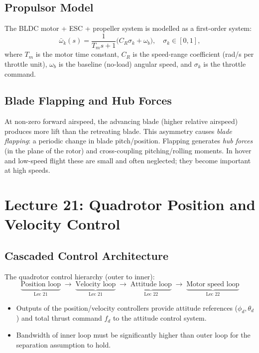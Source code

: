 \documentclass[11pt,a4paper]{article}
\begin{document}
\subsection{Propulsor Model}

The BLDC motor + ESC + propeller system is modelled as a first-order system:
\[
\bar\omega_k(s) = \frac{1}{T_m s+1}\bigl(C_R\sigma_k + \omega_b\bigr),\quad \sigma_k\in[0,1],
\]
where $T_m$ is the motor time constant, $C_R$ is the speed-range coefficient (rad/s per throttle unit), $\omega_b$ is the baseline (no-load) angular speed, and $\sigma_k$ is the throttle command.

\subsection{Blade Flapping and Hub Forces}

At non-zero forward airspeed, the advancing blade (higher relative airspeed) produces more lift than the retreating blade.
This asymmetry causes \emph{blade flapping}: a periodic change in blade pitch/position.
Flapping generates \emph{hub forces} (in the plane of the rotor) and cross-coupling pitching/rolling moments.
In hover and low-speed flight these are small and often neglected; they become important at high speeds.

\newpage
\section{Lecture 21: Quadrotor Position and Velocity Control}

\subsection{Cascaded Control Architecture}

The quadrotor control hierarchy (outer to inner):
\[
\underbrace{\text{Position loop}}_{\text{Lec 21}}
\;\to\;
\underbrace{\text{Velocity loop}}_{\text{Lec 21}}
\;\to\;
\underbrace{\text{Attitude loop}}_{\text{Lec 22}}
\;\to\;
\underbrace{\text{Motor speed loop}}_{\text{Lec 22}}
\]
\begin{itemize}
  \item Outputs of the position/velocity controllers provide attitude references ($\phi_d,\theta_d$) and total thrust command $f_d$ to the attitude control system.
  \item Bandwidth of inner loop must be significantly higher than outer loop for the separation assumption to hold.
\end{itemize}
\end{document}
